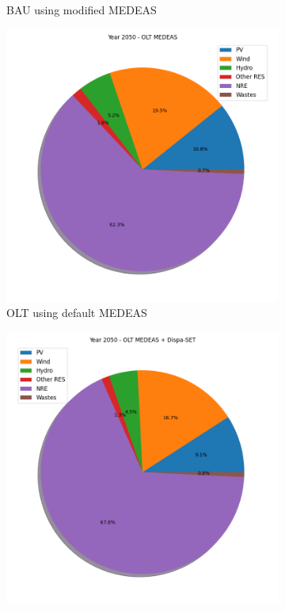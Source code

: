 \begin{figure}[h]
\begin{subfigure}{0.34\textwidth}
        \caption{BAU using modified MEDEAS}
        \label{fig:electricity-mix-BAU-dispa}
    \end{subfigure}
    \hfill
    \begin{subfigure}{0.34\textwidth}
        \includegraphics[width=\textwidth]{resources/images/electricity-mix-OLT-default.png}
        \caption{OLT using default MEDEAS}
        \label{fig:electricity-mix-OLT-def}
    \end{subfigure}
    \begin{subfigure}{0.34\textwidth}
        \includegraphics[width=\textwidth]{resources/images/electricity-mix-OLT-dispa.png}

\end{subfigure}
\end{figure}
